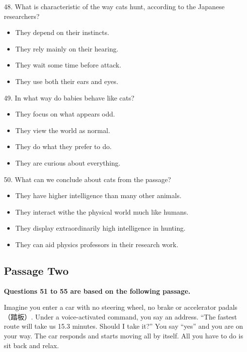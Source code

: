 \documentclass[UTF8,11pt]{ctexart}
\begin{document}
48. What is characteristic of the way cats hunt, according to the Japanese researchers?


\begin{itemize}[leftmargin=2em,itemsep=.2em,topsep=.4em]\item[A.] They depend on their instincts.
\item[B.] They rely mainly on their hearing.
\item[C.] They wait some time before attack.
\item[D.] They use both their ears and eyes.
\end{itemize}

49. In what way do babies behave like cats?


\begin{itemize}[leftmargin=2em,itemsep=.2em,topsep=.4em]\item[A.] They focus on what appears odd.
\item[B.] They view the world as normal.
\end{itemize}

\begin{itemize}[leftmargin=2em,itemsep=.2em,topsep=.4em]\item[C.] They do what they prefer to do.
\item[D.] They are curious about everything.
\end{itemize}

50. What can we conclude about cats from the passage?


\begin{itemize}[leftmargin=2em,itemsep=.2em,topsep=.4em]\item[A.] They have higher intelligence than many other animals.
\item[B.] They interact withe the physical world much like humans.
\item[C.] They display extraordinarily high intelligence in hunting.
\item[D.] They can aid physics professors in their research work.
\end{itemize}

\subsection*{\textbf{Passage Two}}


\textbf{Questions 51 to 55 are based on the following passage.}


Imagine you enter a car with no steering wheel, no brake or accelerator padals（踏板）. Under a voice-activated command, you say an address. “The fastest route will take us 15.3 minutes. Should I take it?” You say “yes” and you are on your way. The car responds and starts moving all by itself. All you have to do is sit back and relax.
\end{document}
